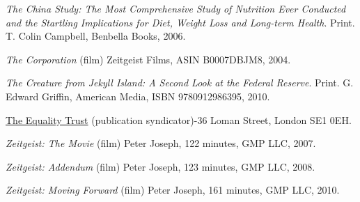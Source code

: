 \item
{\it The China Study: The Most Comprehensive Study of Nutrition Ever Conducted and the Startling Implications for Diet, Weight Loss and Long-term Health}. Print.\crlf
T. Colin Campbell, Benbella Books, 2006.

\item
{\it The Corporation} (film)\crlf
Zeitgeist Films, ASIN B0007DBJM8, 2004.

\item
{\it The Creature from Jekyll Island: A Second Look at the Federal Reserve}. Print.\crlf
G. Edward Griffin, American Media, ISBN 9780912986395, 2010.

\item
\href{http://www.equalitytrust.org.uk/resources/publications}{The Equality Trust} (publication syndicator)-36 Loman Street, London SE1 0EH.

\item
{\it Zeitgeist: The Movie} (film)\crlf
Peter Joseph, 122 minutes, GMP LLC, 2007.

\item
{\it Zeitgeist: Addendum} (film)\crlf
Peter Joseph, 123 minutes, GMP LLC, 2008.

\item
{\it Zeitgeist: Moving Forward} (film)\crlf
Peter Joseph, 161 minutes, GMP LLC, 2010.
\stopitemize

